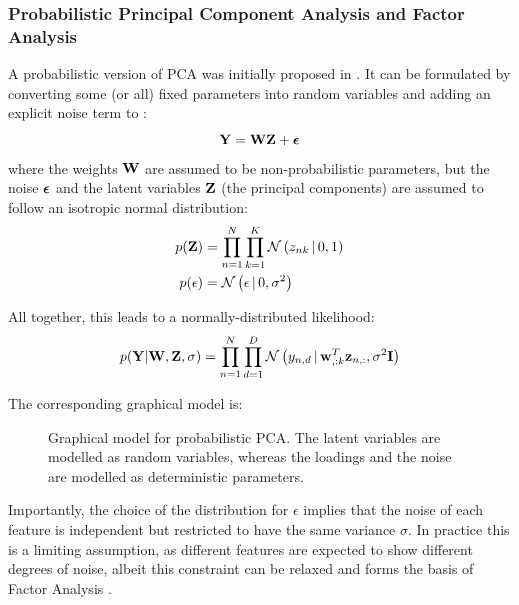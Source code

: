 \subsubsection{Probabilistic Principal Component Analysis and Factor Analysis} \label{section:probabilistic_pca}
A probabilistic version of PCA was initially proposed in \cite{Tipping1999}. It can be formulated by converting some (or all) fixed parameters into random variables and adding an explicit noise term to :
\begin{equation}
	{\bf Y} = {\bf W} {\bf Z} + \mbox{\boldmath $\epsilon$}
\end{equation}
where the weights ${\bf W}$ are assumed to be non-probabilistic parameters, but the noise $\mbox{\boldmath $\epsilon$}$ and the latent variables ${\bf Z}$ (the principal components) are assumed to follow an isotropic normal distribution:
\begin{align*}
	p({\bf Z}) &= \prod_{n=1}^{N} \prod_{k=1}^{K} \mathcal{N}\left(z_{nk} \,|\, 0,1\right) \\
	p(\epsilon) &= \mathcal{N}\left(\epsilon \,|\, 0,\sigma^2\right)
\end{align*}

All together, this leads to a normally-distributed likelihood:
\begin{equation} \label{eq:ppca_lik}
	p({\bf Y}|{\bf W},{\bf Z},\sigma) = \prod_{n=1}^{N} \prod_{d=1}^{D} \mathcal{N}\left(y_{n,d} \,|\, {\bf w}_{,:k}^T {\bf z}_{n,:},\sigma^2 {\bf I}\right)
\end{equation}

The corresponding graphical model is:

\begin{figure}[H]
	\centering
	
	\caption{Graphical model for probabilistic PCA. The latent variables are modelled as random variables, whereas the loadings and the noise are modelled as deterministic parameters.}
	\label{fig:pPCA}
\end{figure}

Importantly, the choice of the distribution for $\epsilon$ implies that the noise of each feature is independent but restricted to have the same variance $\sigma$. In practice this is a limiting assumption, as different features are expected to show different degrees of noise, albeit this constraint can be relaxed and forms the basis of Factor Analysis \cite{Rubin1982,Bishop}.

